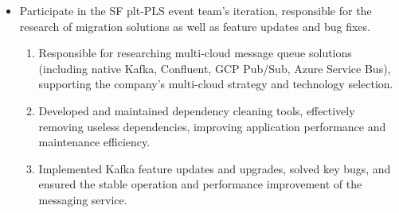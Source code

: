 \documentclass{resume}
\newcommand{\en}[1]{#1}
\newcommand{\zh}[1]{}
\begin{document}
\en{}
\zh{\datedsubsection{\textbf{\href{https://www.sap.com/sea/index.html}{SAP，上海}}}{2022/06 -- 2022/11（每周三天）}}
\en{}
\zh{\role{SuccessFactors}{后端开发实习生}}
\begin{itemize}
      \item \en{Participate in the SF plt-PLS event team's iteration, responsible for the research of migration solutions as well as feature updates and bug fixes.}
            \zh{参与SF plt-PLS event team的迭代，负责迁移方案的调研以及功能更新、bug修复}
            \begin{enumerate}
                  \item \en{Responsible for researching multi-cloud message queue solutions (including native Kafka, Confluent, GCP Pub/Sub, Azure Service Bus), supporting the company's multi-cloud strategy and technology selection.}
                        \zh{负责调研多云消息队列解决方案（包括原生Kafka、Confluent、GCP Pub/Sub、Azure Service Bus），支持公司的多云战略和技术选型。}
                  \item \en{Developed and maintained dependency cleaning tools, effectively removing useless dependencies, improving application performance and maintenance efficiency.}
                        \zh{开发和维护依赖清理工具，有效清除无用依赖，提高应用性能和维护效率。}
                  \item  \en{Implemented Kafka feature updates and upgrades, solved key bugs, and ensured the stable operation and performance improvement of the messaging service.}
                        \zh{实现Kafka功能更新和升级，解决关键bug，确保消息服务的稳定运行和性能提升。}
            \end{enumerate}
\end{itemize}
\end{document}
